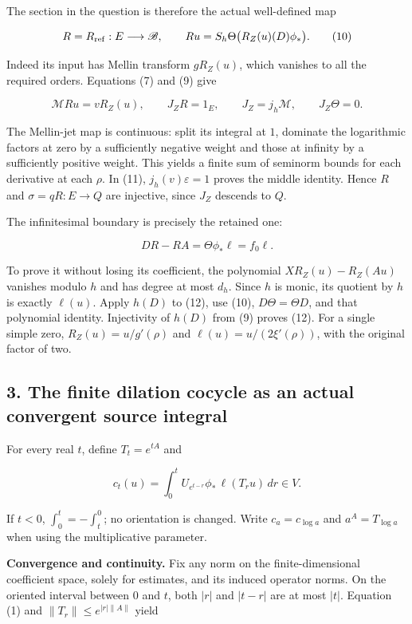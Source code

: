 \documentclass[10pt,a4paper,oneside]{report}
\begin{document}
The section in the question is therefore the actual well-defined map

\[R=R_{\rm ref}:E\longrightarrow\mathscr B,\qquad
Ru=S_h\Theta\bigl(R_Z(u)(D)\phi_*\bigr).\tag{10}\]

Indeed its input has Mellin transform \(gR_Z(u)\), which vanishes to all
the required orders. Equations (7) and (9) give

\[\mathcal MRu=vR_Z(u),\qquad
J_ZR=1_E,\qquad J_Z=j_h\mathcal M,\qquad J_Z\Theta=0.\tag{11}\]

The Mellin-jet map is continuous: split its integral at \(1\), dominate
the logarithmic factors at zero by a sufficiently negative weight and
those at infinity by a sufficiently positive weight. This yields a
finite sum of seminorm bounds for each derivative at each \(\rho\). In
(11), \(j_h(v)\varepsilon=1\) proves the middle identity. Hence \(R\)
and \(\sigma=qR:E\to Q\) are injective, since \(J_Z\) descends to \(Q\).

The infinitesimal boundary is precisely the retained one:

\[DR-RA=\Theta\phi_*\ell=f_0\ell.\tag{12}\]

To prove it without losing its coefficient, the polynomial
\(XR_Z(u)-R_Z(Au)\) vanishes modulo \(h\) and has degree at most
\(d_h\). Since \(h\) is monic, its quotient by \(h\) is exactly
\(\ell(u)\). Apply \(h(D)\) to (12), use (10), \(D\Theta=\Theta D\), and
that polynomial identity. Injectivity of \(h(D)\) from (9) proves (12).
For a single simple zero, \(R_Z(u)=u/g'(\rho)\) and
\(\ell(u)=u/(2\xi'(\rho))\), with the original factor of two.

\subsection{3. The finite dilation cocycle as an actual convergent
source
integral}\label{proof04:the-finite-dilation-cocycle-as-an-actual-convergent-source-integral}

For every real \(t\), define \(T_t=e^{tA}\) and

\[
c_t(u)=\int_0^t U_{e^{t-r}}\phi_*\,\ell(T_ru)\,dr\in V.
\tag{13}
\]

If \(t<0\), \(\int_0^t=-\int_t^0\); no orientation is changed. Write
\(c_a=c_{\log a}\) and \(a^A=T_{\log a}\) when using the multiplicative
parameter.

\textbf{Convergence and continuity.} Fix any norm on the
finite-dimensional coefficient space, solely for estimates, and its
induced operator norms. On the oriented interval between \(0\) and
\(t\), both \(|r|\) and \(|t-r|\) are at most \(|t|\). Equation (1) and
\(\|T_r\|\leq e^{|r|\|A\|}\) yield
\end{document}
